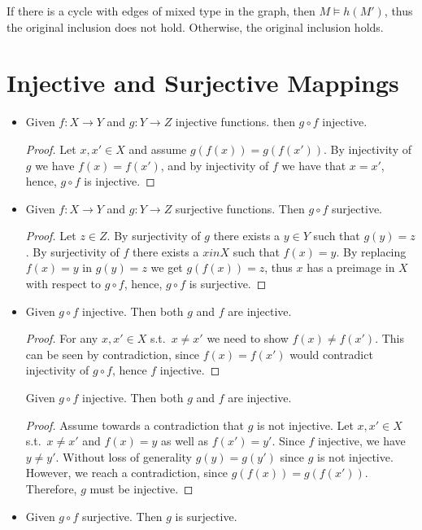 \documentclass[a4paper,12pt]{article}
\begin{document}
If there is a cycle with edges of mixed type in the graph, then $M \models h(M')$, thus the original inclusion does not hold. Otherwise, the original inclusion holds.


\section{Injective and Surjective Mappings}

\begin{itemize}
\item{Given $f : X \rightarrow Y$ and $g : Y \rightarrow Z$ injective functions. then $g \circ f$ injective.

\begin{proof}
Let $x, x' \in X$ and assume $g(f(x)) = g(f(x'))$. By injectivity of $g$ we have $f(x) = f(x')$, and by injectivity of $f$ we have that $x = x'$, hence, $g \circ f$ is injective.
\end{proof}
}
\item{Given $f : X \rightarrow Y$ and $g : Y \rightarrow Z$ surjective functions. Then $g \circ f$ surjective.

\begin{proof}
Let $z \in Z$. By surjectivity of $g$ there exists a $y \in Y$ such that $g(y) = z$. By surjectivity of $f$ there exists a $x in X$ such that $f(x) = y$. By replacing $f(x) = y$ in $g(y) = z$ we get $g(f(x)) = z$, thus $x$ has a preimage in $X$ with respect to $g \circ f$, hence, $g \circ f$ is surjective.
\end{proof}
}
\item{
Given $g \circ f$ injective. Then both $g$ and $f$ are injective.

\begin{proof}
For any $x, x' \in X$ s.t.\ $x \neq x'$ we need to show $f(x) \neq f(x')$. This can be seen by contradiction, since $f(x) = f(x')$ would contradict injectivity of  $g \circ f$, hence $f$ injective.
\end{proof}

Given $g \circ f$ injective. Then both $g$ and $f$ are injective.

\begin{proof}
Assume towards a contradiction that $g$ is not injective.  Let $x, x' \in X$ s.t.\ $x \neq x'$ and $f(x) = y$ as well as $f(x') = y'$. Since $f$ injective, we have $y \neq y'$. Without loss of generality $g(y) = g(y')$ since $g$ is not injective. However, we reach a contradiction, since $g(f(x)) = g(f(x'))$. Therefore, $g$ must be injective.
\end{proof}
}
\item{
Given $g \circ f$ surjective. Then $g$ is surjective.

}
\end{itemize}
\end{document}
